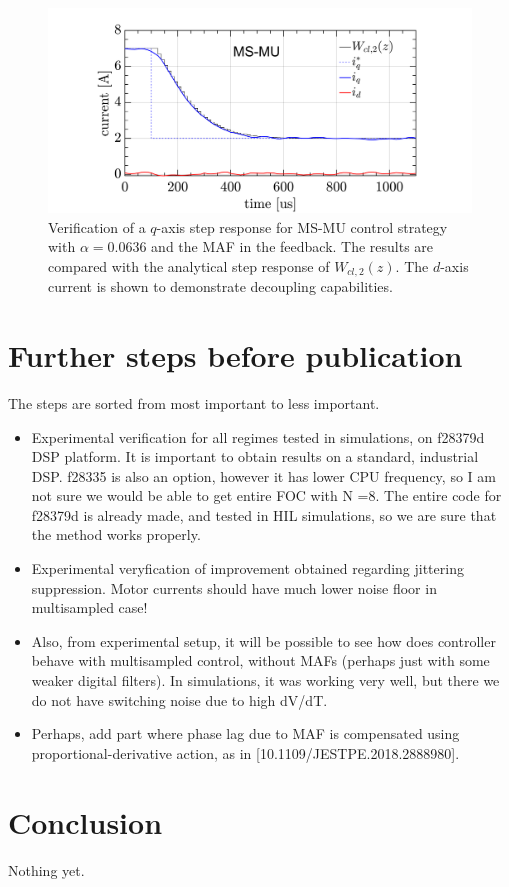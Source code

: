 \documentclass[journal]{IEEEtran}
\begin{document}
\begin{figure}[t!]
    \centerline{\includegraphics[width=1\linewidth]{figures/ivan figs/MSMUstepHIL.png}}
    \caption{Verification of a $q$-axis step response for MS-MU control strategy with $\alpha = 0.0636$ and the MAF in the feedback. The results are compared with the analytical step response of $W_{cl,2}(z)$. The $d$-axis current is shown to demonstrate decoupling capabilities.}
    \label{fig:MSMUmaf_step} 
\end{figure}


\section{Further steps before publication}
The steps are sorted from most important to less important.
\begin{itemize}
\item{Experimental verification for all regimes tested in simulations, on f28379d DSP platform. It is important to obtain results on a standard, industrial DSP. f28335 is also an option, however it has lower CPU frequency, so I am not sure we would be able to get entire FOC with N =8. The entire code for f28379d is already made, and tested in HIL simulations, so we are sure that the method works properly.}
\item{Experimental veryfication of improvement obtained regarding jittering suppression. Motor currents should have much lower noise floor in multisampled case!}
\item{Also, from experimental setup, it will be possible to see how does controller behave with multisampled control, without MAFs (perhaps just with some weaker digital filters). In simulations, it was working very well, but there we do not have switching noise due to high dV/dT.}
\item{Perhaps, add part where phase lag due to MAF is compensated using proportional-derivative action, as in [10.1109/JESTPE.2018.2888980].}
\end{itemize}

\section{Conclusion}
Nothing yet.

\ifCLASSOPTIONcaptionsoff
  \newpage
\fi



\end{document}
